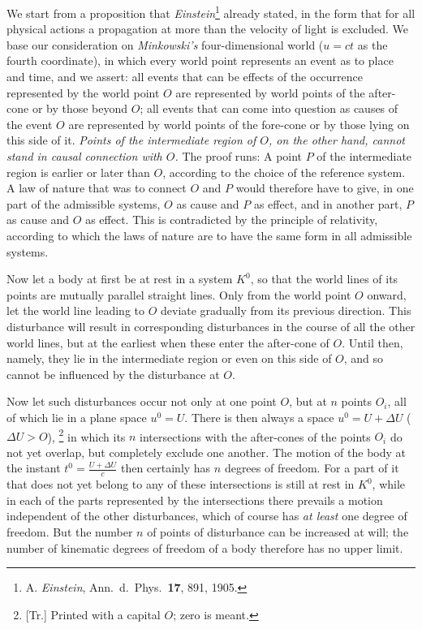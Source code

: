 \documentclass[12pt,a4paper]{article}
\newcounter{trnote}
\newcommand{\trnote}[1]{\stepcounter{trnote}\begingroup\renewcommand{\thefootnote}{\alph{trnote}}%
  \footnote[\value{trnote}]{[Tr.] #1}\endgroup}
\begin{document}
We start from a proposition that \emph{Einstein}\footnote[1]{A. \emph{Einstein}, Ann.\ d.\ Phys.\ \textbf{17}, 891, 1905.} already stated, in the form that for all physical actions a propagation at more than the velocity of light is excluded.
We base our consideration on \emph{Minkowski's} four-dimensional world ($u = ct$ as the fourth coordinate), in which every world point represents an event as to place and time, and we assert: all events that can be effects of the occurrence represented by the world point $O$ are represented by world points of the after-cone or by those beyond $O$; all events that can come into question as causes of the event $O$ are represented by world points of the fore-cone or by those lying on this side of it. \emph{Points of the intermediate region of $O$, on the other hand, cannot stand in causal connection with $O$.} The proof runs:
A point $P$ of the intermediate region is earlier or later than $O$, according to the choice of the reference system.
A law of nature that was to connect $O$ and $P$ would therefore have to give, in one part of the admissible systems, $O$ as cause and $P$ as effect, and in another part, $P$ as cause and $O$ as effect.
This is contradicted by the principle of relativity, according to which the laws of nature are to have the same form in all admissible systems.

Now let a body at first be at rest in a system $K^0$, so that the world lines of its points are mutually parallel straight lines.
Only from the world point $O$ onward, let the world line leading to $O$ deviate gradually from its previous direction.
This disturbance will result in corresponding disturbances in the course of all the other world lines, but at the earliest when these enter the after-cone of $O$.
Until then, namely, they lie in the intermediate region or even on this side of $O$, and so cannot be influenced by the disturbance at $O$.

Now let such disturbances occur not only at one point $O$, but at $n$ points $O_i$, all of which lie in a plane space $u^0 = U$.
There is then always a space $u^0 = U + \varDelta U$ ($\varDelta U > O$),\trnote{Printed with a capital $O$; zero is meant.} in which its $n$ intersections with the after-cones of the points $O_i$ do not yet overlap, but completely exclude one another.
The motion of the body at the instant $t^0 = \frac{U + \varDelta U}{c}$ then certainly has $n$ degrees of freedom.
For a part of it that does not yet belong to any of these intersections is still at rest in $K^0$, while in each of the parts represented by the intersections there prevails a motion independent of the other disturbances, which of course has \emph{at least} one degree of freedom.
But the number $n$ of points of disturbance can be increased at will; the number of kinematic degrees of freedom of a body therefore has no upper limit.
\end{document}
